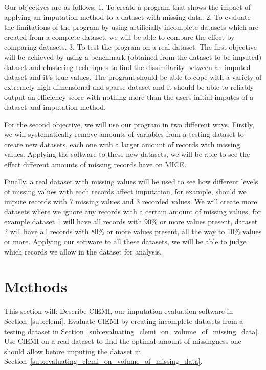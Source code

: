 \documentclass[conference,compsoc]{IEEEtran}
\begin{document}
	Our objectives are as follows: 1. To create a program that shows the impact of applying an imputation method to a dataset with missing data. 2. To evaluate the limitations of the program by using artificially incomplete datasets which are created from a complete dataset, we will be able to compare the effect by comparing datasets. 3. To test the program on a real dataset. The first objective will be achieved by using a benchmark (obtained from the dataset to be imputed) dataset and clustering techniques to find the dissimilarity between an imputed dataset and it's true values. The program should be able to cope with a variety of extremely high dimensional and sparse dataset and it should be able to reliably output an efficiency score with nothing more than the users initial imputes of a dataset and imputation method. 

	For the second objective, we will use our program in two different ways. Firstly, we will systematically remove amounts of variables from a testing dataset to create new datasets, each one with a larger amount of records with missing values. Applying the software to these new datasets, we will be able to see the effect different amounts of missing records have on MICE.

	Finally, a real dataset with missing values will be used to see how different levels of missing values with each records affect imputation, for example, should we impute records with 7 missing values and 3 recorded values. We will create more datasets where we ignore any records with a certain amount of missing values, for example dataset 1 will have all records with 90\% or more values present, dataset 2 will have all records with 80\% or more values present, all the way to 10\% values or more. Applying our software to all these datasets, we will be able to judge which records we allow in the dataset for analysis.





	\section{Methods} %
	\label{sec:methods}
	This section will: Describe ClEMI, our imputation evaluation software in Section~\ref{sub:clemi}. Evaluate ClEMI by creating incomplete datasets from a testing dataset in Section~\ref{sub:evaluating_clemi_on_volume_of_missing_data}. Use ClEMI on a real dataset to find the optimal amount of missingness one should allow before imputing the dataset in Section~\ref{sub:evaluating_clemi_on_volume_of_missing_data}.
\end{document}
